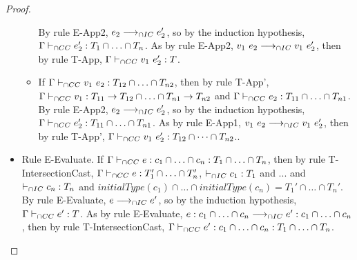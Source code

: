 \documentclass[a4paper]{article}
\begin{document}
\begin{proof}
\begin{itemize}
\begin{itemize}
        By rule E-App2, $e_2 \longrightarrow_{\cap IC} e_2'$, so by the induction hypothesis, $\Gamma \vdash_{\cap CC} e_2' : T_1 \cap \ldots \cap T_n$.
        As by rule E-App2, $v_1\ e_2 \longrightarrow_{\cap IC} v_1\ e_2'$, then by rule T-App, $\Gamma \vdash_{\cap CC} v_1\ e_2' : T$.
        \item If $\Gamma \vdash_{\cap CC} v_1\ e_2 : T_{12} \cap \ldots \cap T_{n2}$, then by rule T-App', $\Gamma \vdash_{\cap CC} v_1 : T_{11} \rightarrow T_{12} \cap \ldots \cap T_{n1} \rightarrow T_{n2}$ and $\Gamma \vdash_{\cap CC} e_2 : T_{11} \cap \ldots \cap T_{n1}$.
        By rule E-App2, $e_2 \longrightarrow_{\cap IC} e_2'$, so by the induction hypothesis, $\Gamma \vdash_{\cap CC} e_2' : T_{11} \cap \ldots \cap T_{n1}$.
        As by rule E-App1, $v_1\ e_2 \longrightarrow_{\cap IC} v_1\ e_2'$, then by rule T-App', $\Gamma \vdash_{\cap CC} v_1\ e_2' : T_{12} \cap \dots \cap T_{n2}$..
    \end{itemize}
    \item Rule E-Evaluate. If $\Gamma \vdash_{\cap CC} e : c_1 \cap \ldots \cap c_n : T_1 \cap \ldots \cap T_n$, then by rule T-IntersectionCast, $\Gamma \vdash_{\cap CC} e : T_1' \cap \ldots \cap T_n'$, $\vdash_{\cap IC} c_1 : T_1$ and ... and $\vdash_{\cap IC} c_n : T_n$ and $initialType(c_1) \cap \ldots \cap initialType(c_n) = T_1' \cap \ldots \cap T_n'$.
    By rule E-Evaluate, $e \longrightarrow_{\cap IC} e'$, so by the induction hypothesis, $\Gamma \vdash_{\cap CC} e' : T$.
    As by rule E-Evaluate, $e : c_1 \cap \ldots \cap c_n \longrightarrow_{\cap IC} e' : c_1 \cap \ldots \cap c_n$, then by rule T-IntersectionCast, $\Gamma \vdash_{\cap CC} e' : c_1 \cap \ldots \cap c_n : T_1 \cap \ldots \cap T_n$.
\end{itemize}
\end{proof}
\end{document}
